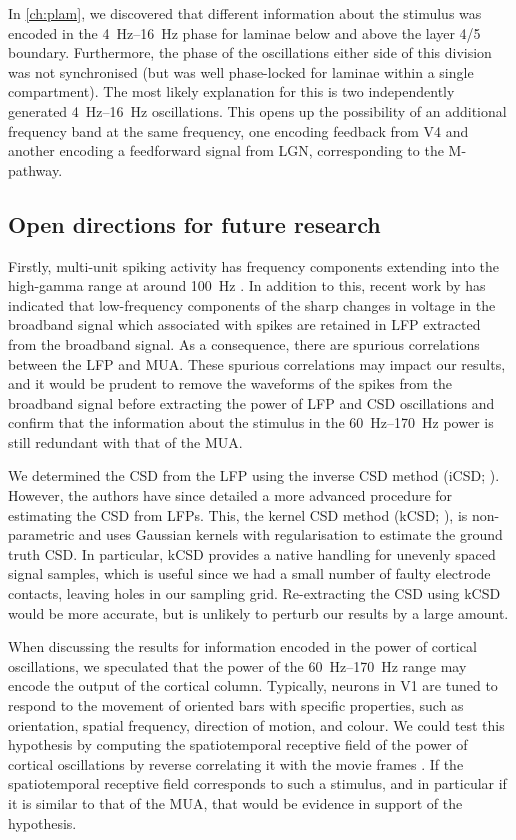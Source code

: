 In \autoref{ch:plam}, we discovered that different information about the stimulus was encoded in the \SIrange{4}{16}{Hz} phase for laminae below and above the layer 4/5 boundary.
Furthermore, the phase of the oscillations either side of this division was not synchronised (but was well phase-locked for laminae within a single compartment).
The most likely explanation for this is two independently generated \SIrange{4}{16}{Hz} oscillations.
This opens up the possibility of an additional frequency band at the same frequency, one encoding feedback from \ac{V4} and another encoding a feedforward signal from \ac{LGN}, corresponding to the M-pathway.


\subsection{Open directions for future research}

Firstly, multi-unit spiking activity has frequency components extending into the high-gamma range at around \SI{100}{Hz} \citep{Einevoll2013}.
In addition to this, recent work by \citet{Zanos2011} has indicated that low-frequency components of the sharp changes in voltage in the broadband signal which associated with spikes are retained in \ac{LFP} extracted from the broadband signal.
As a consequence, there are spurious correlations between the \ac{LFP} and \ac{MUA}.
These spurious correlations may impact our results, and it would be prudent to remove the waveforms of the spikes from the broadband signal before extracting the power of \ac{LFP} and \ac{CSD} oscillations \citep{Zanos2011} and confirm that the information about the stimulus in the \SIrange{60}{170}{Hz} power is still redundant with that of the \ac{MUA}.

We determined the \ac{CSD} from the \ac{LFP} using the inverse \ac{CSD} method (iCSD; \citealp{Pettersen2006}).
However, the authors have since detailed a more advanced procedure for estimating the \ac{CSD} from \acp{LFP}.
This, the kernel \acl{CSD} method (kCSD; \citealp{Potworowski2012}), is non-parametric and uses Gaussian kernels with regularisation to estimate the ground truth \ac{CSD}.
In particular, kCSD provides a native handling for unevenly spaced signal samples, which is useful since we had a small number of faulty electrode contacts, leaving holes in our sampling grid.
Re-extracting the \ac{CSD} using kCSD would be more accurate, but is unlikely to perturb our results by a large amount.

When discussing the results for information encoded in the power of cortical oscillations, we speculated that the power of the \SIrange{60}{170}{Hz} range may encode the output of the cortical column.
Typically, neurons in \ac{V1} are tuned to respond to the movement of oriented bars with specific properties, such as orientation, spatial frequency, direction of motion, and colour.
We could test this hypothesis by computing the spatiotemporal receptive field of the power of cortical oscillations by reverse correlating it with the movie frames \citep{Theunissen2001}.
If the spatiotemporal receptive field corresponds to such a stimulus, and in particular if it is similar to that of the \ac{MUA}, that would be evidence in support of the hypothesis.

